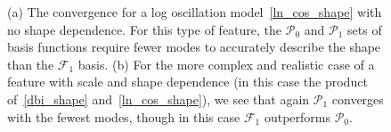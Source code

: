 \documentclass[a4paper,12pt]{extarticle}
\newcommand{\Lbasic}{\mathcal{P}_0}
\newcommand{\Linvk}{\mathcal{P}_1}
\newcommand{\Finvk}{\mathcal{F}_1}
\begin{document}
\begin{figure}[!pth]
\centering     %
{}
\caption{
    (a) The convergence for a log oscillation model~\eqref{ln_cos_shape} with no shape dependence.
    For this type of feature, the $\Lbasic$ and $\Linvk$ sets of basis functions require fewer modes
    to accurately describe the shape than the $\Finvk$ basis.
    (b) For the more complex and realistic case of a
    feature with scale and shape dependence (in this case the product of~\eqref{dbi_shape}
    and~\eqref{ln_cos_shape}), we see that again $\Linvk$ converges with the fewest modes,
    though in this case $\Finvk$ outperforms $\Lbasic$.
}\label{fig:log_recon_osc_dbiosc}
\end{figure}
\end{document}
